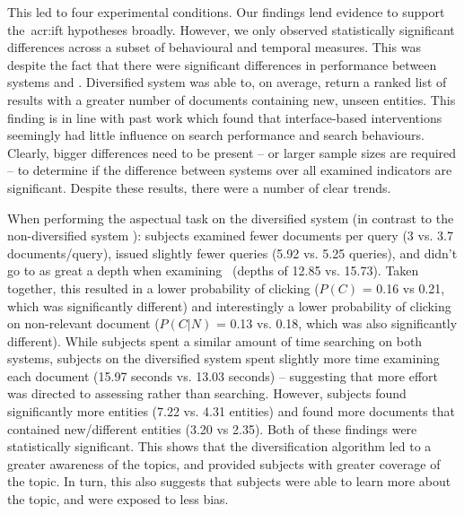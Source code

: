 This led to four experimental conditions. Our findings lend evidence to support the~\gls{acr:ift} hypotheses broadly. However, we only observed statistically significant differences across a subset of behavioural and temporal measures. This was despite the fact that there were significant differences in performance between systems  and . Diversified system  was able to, on average, return a ranked list of results with a greater number of documents containing new, unseen entities. This finding is in line with past work which found that interface-based interventions seemingly had little influence on search performance and search behaviours. Clearly, bigger differences need to be present -- or larger sample sizes are required -- to determine if the difference between systems over all examined indicators are significant. Despite these results, there were a number of clear trends.

When performing the aspectual task  on the diversified system  (in contrast to the non-diversified system ): subjects examined fewer documents per query (3 vs. 3.7 documents/query), issued slightly fewer queries (5.92 vs. 5.25 queries), and didn't go to as great a depth when examining~ (depths of 12.85 vs. 15.73). Taken together, this resulted in a lower probability of clicking ($P(C)$ = 0.16 vs 0.21, which was significantly different) and interestingly a lower probability of clicking on non-relevant document ($P(C|N)$ = 0.13 vs. 0.18, which was also significantly different). While subjects spent a similar amount of time searching on both systems, subjects on the diversified system spent slightly more time examining each document (15.97 seconds vs. 13.03 seconds) -- suggesting that more effort was directed to assessing rather than searching. However, subjects found significantly more entities (7.22 vs. 4.31 entities) and found more documents that contained new/different entities (3.20 vs 2.35). Both of these findings were statistically significant. This shows that the diversification algorithm led to a greater awareness of the topics, and provided subjects with greater coverage of the topic. In turn, this also suggests that subjects were able to learn more about the topic, and were exposed to less bias.

